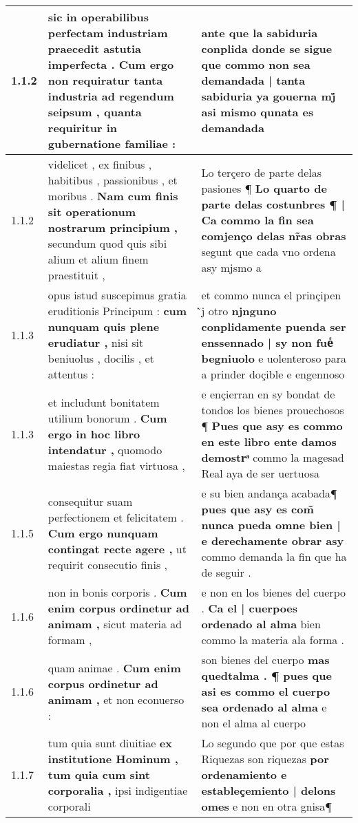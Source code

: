 \begin{tabular}{|p{1cm}|p{6.5cm}|p{6.5cm}|}

\hline
1.1.2 & sic in operabilibus perfectam industriam praecedit astutia imperfecta . \textbf{ Cum ergo non requiratur tanta industria ad regendum seipsum , } quanta requiritur in gubernatione familiae : & ante que la sabiduria conplida donde se sigue \textbf{ que commo non sea demandada | tanta sabiduria ya gouerna mj̊ } asi mismo qunata es demandada \\\hline
1.1.2 & videlicet , ex finibus , habitibus , passionibus , et moribus . \textbf{ Nam cum finis sit operationum nostrarum principium , } secundum quod quis sibi alium et alium finem praestituit , & Lo terçero de parte delas pasiones ¶ \textbf{ Lo quarto de parte delas costunbres ¶ | Ca commo la fin sea comjenço delas nr̃as obras } segunt que cada vno ordena asy mjsmo a \\\hline
1.1.3 & opus istud suscepimus gratia eruditionis Principum : \textbf{ cum nunquam quis plene erudiatur , } nisi sit beniuolus , docilis , et attentus : & et commo nunca el prinçipen ̃j otro \textbf{ njnguno conplidamente puenda ser enssennado | sy non fueᷤ begniuolo } e uolenteroso para a prinder doçible e engennoso \\\hline
1.1.3 & et includunt bonitatem utilium bonorum . \textbf{ Cum ergo in hoc libro intendatur , } quomodo maiestas regia fiat virtuosa , & e ençierran en sy bondat de tondos los bienes prouechosos ¶ \textbf{ Pues que asy es commo en este libro ente damos demostrͣ } commo la magesad Real aya de ser uertuosa \\\hline
1.1.5 & consequitur suam perfectionem et felicitatem . \textbf{ Cum ergo nunquam contingat recte agere , } ut requirit consecutio finis , & e su bien andança acabada¶ \textbf{ pues que asy es com̃ nunca pueda omne bien | e derechamente obrar asy } commo demanda la fin que ha de seguir . \\\hline
1.1.6 & non in bonis corporis . \textbf{ Cum enim corpus ordinetur ad animam , } sicut materia ad formam , & e non en los bienes del cuerpo . \textbf{ Ca el | cuerpoes ordenado al alma } bien commo la materia ala forma . \\\hline
1.1.6 & quam animae . \textbf{ Cum enim corpus ordinetur ad animam , } et non econuerso : & son bienes del cuerpo \textbf{ mas quedtalma . ¶ pues que asi es commo el cuerpo sea ordenado al alma } e non el alma al cuerpo \\\hline
1.1.7 & tum quia sunt diuitiae \textbf{ ex institutione Hominum , tum quia cum sint corporalia , } ipsi indigentiae corporali & Lo segundo que por que estas Riquezas son riquezas \textbf{ por ordenamiento e estableçemiento | delons omes } e non en otra gnisa¶ \\\hline

\end{tabular}
